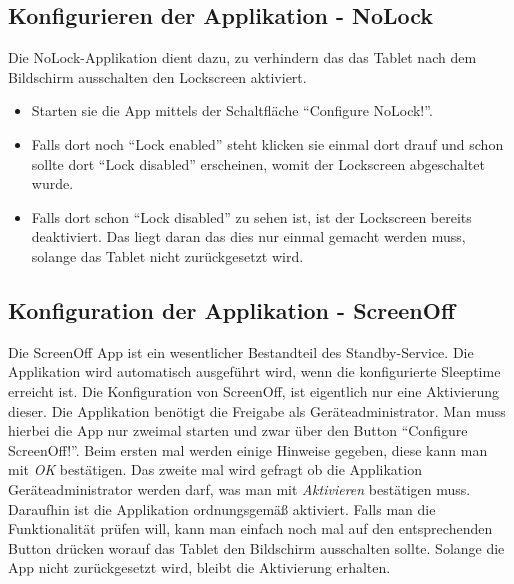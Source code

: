 \begin{flushleft}
  \subsection{Konfigurieren der Applikation - NoLock}
    Die NoLock-Applikation dient dazu, zu verhindern das das Tablet nach dem Bildschirm ausschalten den Lockscreen aktiviert.
    \begin{itemize}
      \item Starten sie die App mittels der Schaltfläche ``Configure NoLock!''.
      \item Falls dort noch ``Lock enabled'' steht klicken sie einmal dort drauf und schon sollte dort ``Lock disabled'' erscheinen, womit der Lockscreen abgeschaltet wurde.
      \item Falls dort schon ``Lock disabled'' zu sehen ist, ist der Lockscreen bereits deaktiviert. Das liegt daran das dies nur einmal gemacht werden muss, solange das Tablet nicht zurückgesetzt wird.
    \end{itemize}
  \subsection{Konfiguration der Applikation - ScreenOff}
    Die ScreenOff App ist ein wesentlicher Bestandteil des Standby-Service. Die Applikation wird automatisch ausgeführt wird, wenn die konfigurierte Sleeptime erreicht ist.
    Die Konfiguration von ScreenOff, ist eigentlich nur eine Aktivierung dieser. Die Applikation benötigt die Freigabe als Geräteadministrator. Man muss hierbei die App nur zweimal starten und zwar über den Button ``Configure ScreenOff!''. Beim ersten mal werden einige Hinweise gegeben, diese kann man mit \textit{OK} bestätigen. Das zweite mal wird gefragt ob die Applikation Geräteadministrator werden darf, was man mit \textit{Aktivieren} bestätigen muss.
    Daraufhin ist die Applikation ordnungsgemäß aktiviert. Falls man die Funktionalität prüfen will, kann  man einfach noch mal auf den entsprechenden Button drücken worauf das Tablet den Bildschirm ausschalten sollte. Solange die App nicht zurückgesetzt wird, bleibt die Aktivierung erhalten.

\end{flushleft}
